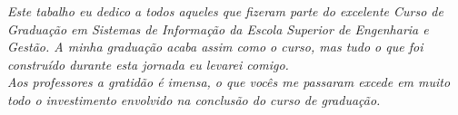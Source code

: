 \begin{dedicatoria}
   \vspace*{\fill}
   \centering
   \noindent
   \textit{ Este tabalho eu dedico a todos aqueles que fizeram parte do excelente Curso de Graduação em Sistemas de Informação da Escola Superior de Engenharia e Gestão. A minha graduação acaba assim como o curso, mas tudo o que foi construído durante esta jornada eu levarei comigo.
   \\ Aos professores a gratidão é imensa, o que vocês me passaram excede em muito todo o investimento envolvido na conclusão do curso de graduação.
   } \vspace*{\fill}
\end{dedicatoria}
